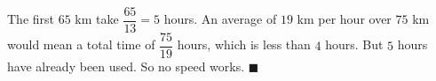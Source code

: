 The first $65$ km take $\dfrac{65}{13}=5$ hours. An average of $19$ km per hour over $75$ km would mean a total time of $\dfrac{75}{19}$ hours, which is less than $4$ hours. But $5$ hours have already been used. So no speed works. $\blacksquare$
